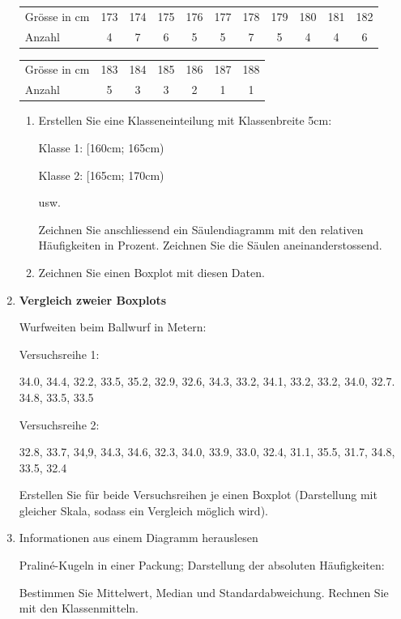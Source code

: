 \begin{enumerate}
 \begin{tabular}{lcccccccccc}
   Grösse in cm & 173 & 174 & 175 & 176 & 177 & 178 & 179 & 180 & 181 & 182\\
   Anzahl      &  4  &  7  &  6  &  5  &  5  &  7  &  5  &  4  &  4  &  6
   \end{tabular}

  \begin{tabular}{lcccccc}
   Grösse in cm & 183 & 184 & 185 & 186 & 187 & 188\\
   Anzahl      &  5  &  3  &  3  &  2  &  1  &  1 
  \end{tabular}

  \begin{enumerate}[label=\alph*)]
  \item Erstellen Sie eine Klasseneinteilung mit Klassenbreite 5cm:

    Klasse 1: [160cm; 165cm)

      Klasse 2: [165cm; 170cm)

        usw.

        Zeichnen Sie anschliessend ein Säulendiagramm mit den relativen
        Häufigkeiten in Prozent. Zeichnen Sie die Säulen
        aneinanderstossend.

        \item Zeichnen Sie einen Boxplot mit diesen Daten.
\end{enumerate}


\item \textbf{Vergleich zweier Boxplots}

  Wurfweiten beim Ballwurf in Metern:

  Versuchsreihe 1:

  34.0, 34.4, 32.2, 33.5, 35.2, 32.9, 32.6, 34.3, 33.2, 34.1,
  33.2, 33.2, 34.0, 32.7. 34.8, 33.5, 33.5

  Versuchsreihe 2:

  32.8, 33.7, 34,9, 34.3, 34.6, 32.3, 34.0, 33.9, 33.0, 32.4,
  31.1, 35.5, 31.7, 34.8, 33.5, 32.4

  Erstellen Sie für beide Versuchsreihen je einen Boxplot (Darstellung
  mit gleicher Skala, sodass ein Vergleich möglich wird).



  \item{Informationen aus einem Diagramm herauslesen}

    Praliné-Kugeln in einer Packung; Darstellung der absoluten
    Häufigkeiten:
    

Bestimmen Sie Mittelwert, Median und Standardabweichung.
Rechnen Sie mit den Klassenmitteln.

\end{enumerate}


